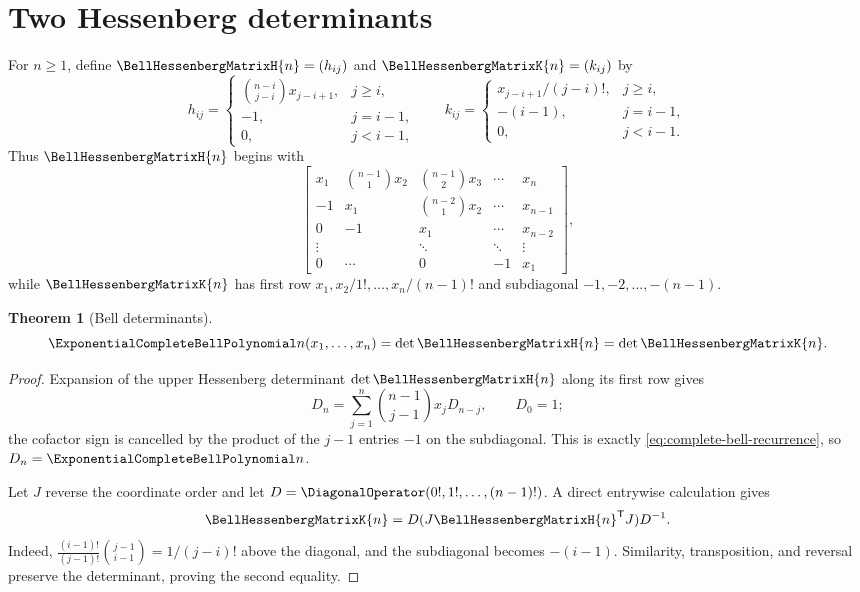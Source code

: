 \documentclass[11pt,a4paper,oneside,openany]{book}
\newtheorem{theorem}{Theorem}[chapter]
\theoremstyle{definition}
\theoremstyle{remark}
\begin{document}
\section{Two Hessenberg determinants}
For $n\ge1$, define $\BellHessenbergMatrixH{n}=(h_{ij})$ and $\BellHessenbergMatrixK{n}=(k_{ij})$ by
\[
 h_{ij}=\begin{cases}
 \binom{n-i}{j-i}x_{j-i+1},&j\ge i,\\
 -1,&j=i-1,\\0,&j<i-1,
 \end{cases}
 \qquad
 k_{ij}=\begin{cases}
 x_{j-i+1}/(j-i)!,&j\ge i,\\
 -(i-1),&j=i-1,\\0,&j<i-1.
 \end{cases}
\]
Thus $\BellHessenbergMatrixH{n}$ begins with
\[
\begin{bmatrix}
 x_1&\binom{n-1}{1}x_2&\binom{n-1}{2}x_3&\cdots&x_n\\
 -1&x_1&\binom{n-2}{1}x_2&\cdots&x_{n-1}\\
 0&-1&x_1&\cdots&x_{n-2}\\
 \vdots&&\ddots&\ddots&\vdots\\
 0&\cdots&0&-1&x_1
\end{bmatrix},
\]
while $\BellHessenbergMatrixK{n}$ has first row
$x_1,x_2/1!,\ldots,x_n/(n-1)!$ and subdiagonal
$-1,-2,\ldots,-(n-1)$.

\begin{theorem}[Bell determinants]\label{thm:bell-determinants}
\begin{equation}\label{eq:bell-determinants}
 \ExponentialCompleteBellPolynomial n(x_1,\ldots,x_n)=\det \BellHessenbergMatrixH{n}=\det \BellHessenbergMatrixK{n}.
\end{equation}
\end{theorem}
\begin{proof}
Expansion of the upper Hessenberg determinant $\det \BellHessenbergMatrixH{n}$ along its first row gives
\[
 D_n=\sum_{j=1}^{n}\binom{n-1}{j-1}x_jD_{n-j},\qquad D_0=1;
\]
the cofactor sign is cancelled by the product of the $j-1$ entries $-1$ on the
subdiagonal.  This is exactly \eqref{eq:complete-bell-recurrence}, so
$D_n=\ExponentialCompleteBellPolynomial n$.

Let $J$ reverse the coordinate order and let
$D=\DiagonalOperator(0!,1!,\ldots,(n-1)!)$.  A direct entrywise calculation gives
\[
 \BellHessenbergMatrixK{n}=D(J\BellHessenbergMatrixH{n}^{\mathsf T}J)D^{-1}.
\]
Indeed,
$\frac{(i-1)!}{(j-1)!}\binom{j-1}{i-1}=1/(j-i)!$ above the diagonal, and the
subdiagonal becomes $-(i-1)$.  Similarity, transposition, and reversal preserve
the determinant, proving the second equality.
\end{proof}
\end{document}
